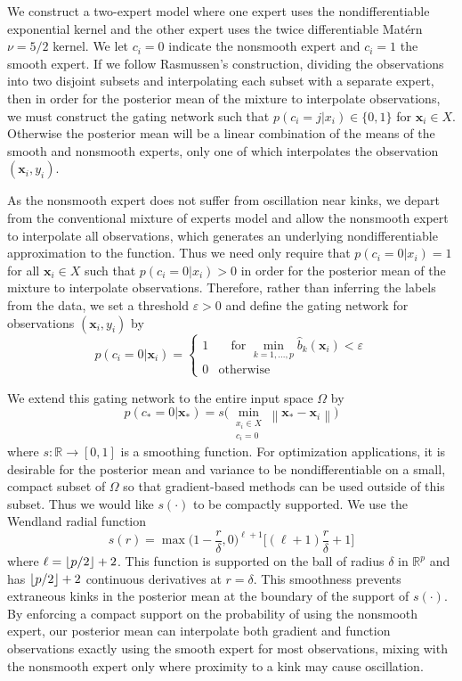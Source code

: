 \documentclass{article}
\newcommand{\norm}[1]{\left\lVert#1\right\rVert}
\renewcommand{\vec}[1]{\mathbf{#1}}
\newcommand{\R}{\mathbb{R}}
\DeclarePairedDelimiter\floor{\lfloor}{\rfloor}
\begin{document}
We construct a two-expert model where one expert uses the nondifferentiable exponential kernel and the other expert uses the twice differentiable Mat\'ern $\nu = 5/2$ kernel. We let $c_i=0$ indicate the nonsmooth expert and $c_i=1$ the smooth expert. If we follow Rasmussen's construction, dividing the observations into two disjoint subsets and interpolating each subset with a separate expert, then in order for the posterior mean of the mixture to interpolate observations, we must construct the gating network such that $p(c_i = j | x_i) \in \{0,1\}$ for $\vec{x}_i \in X$. Otherwise the posterior mean will be a linear combination of the means of the smooth and nonsmooth experts, only one of which interpolates the observation $(\vec{x}_i, y_i)$.

As the nonsmooth expert does not suffer from oscillation near kinks, we depart from the conventional mixture of experts model and allow the nonsmooth expert to interpolate all observations, which generates an underlying nondifferentiable approximation to the function. Thus we need only require that $p(c_i = 0 | x_i) = 1$ for all $\vec{x}_i \in X$ such that $p(c_i = 0 | x_i) > 0$ in order for the posterior mean of the mixture to interpolate observations. Therefore, rather than inferring the labels from the data, we set a threshold $\varepsilon > 0$ and define the gating network for observations $(\vec{x}_i, y_i)$ by
$$ p(c_i = 0 | \vec{x}_i) = \left\{\begin{array}{lr}
        1 & \quad \text{for } \displaystyle\min_{k=1,...,p} \hat{b}_k(\vec{x}_i) < \varepsilon \\
        0 & \text{otherwise} \qquad
        \end{array} $$

We extend this gating network to the entire input space $\Omega$ by
$$ p(c_* = 0 | \vec{x}_*) = s\Bigg(\min_{\substack{x_i \in X \\ c_i = 0}} \norm{\vec{x}_* - \vec{x}_i}\Bigg) $$
where $s: \R \to [0,1]$ is a smoothing function. For optimization applications, it is desirable for the posterior mean and variance to be nondifferentiable on a small, compact subset of $\Omega$ so that gradient-based methods can be used outside of this subset. Thus we would like $s(\cdot)$ to be compactly supported. We use the Wendland radial function~\cite{wendland1995piecewise, fasshauer1998smoothing}
$$ s(r) = \max\Big( 1-\frac{r}{\delta}, 0 \Big)^{\ell+1} \Big[(\ell + 1) \frac{r}{\delta} + 1\Big]$$
where $\ell = \floor{p/2} + 2$. This function is supported on the ball of radius $\delta$ in $\R^p$ and has $\floor{p/2} + 2$ continuous derivatives at $r = \delta$. This smoothness prevents extraneous kinks in the posterior mean at the boundary of the support of $s(\cdot)$. By enforcing a compact support on the probability of using the nonsmooth expert, our posterior mean can interpolate both gradient and function observations exactly using the smooth expert for most observations, mixing with the nonsmooth expert only where proximity to a kink may cause oscillation.
\end{document}
